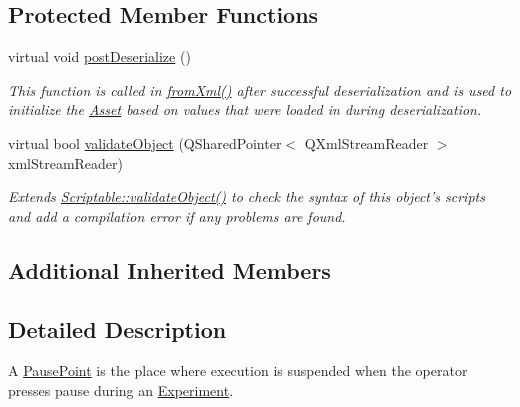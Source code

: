 \subsection*{Protected Member Functions}
\begin{DoxyCompactItemize}
\item 
virtual void \hyperlink{class_picto_1_1_pause_point_ad0934a59b009d24126005cab68edb641}{post\-Deserialize} ()
\begin{DoxyCompactList}\small\item\em This function is called in \hyperlink{class_picto_1_1_asset_a8bed4da09ecb1c07ce0dab313a9aba67}{from\-Xml()} after successful deserialization and is used to initialize the \hyperlink{class_picto_1_1_asset}{Asset} based on values that were loaded in during deserialization. \end{DoxyCompactList}\item 
\hypertarget{class_picto_1_1_pause_point_aea2bb7d2a12c263796508f90744a3220}{virtual bool \hyperlink{class_picto_1_1_pause_point_aea2bb7d2a12c263796508f90744a3220}{validate\-Object} (Q\-Shared\-Pointer$<$ Q\-Xml\-Stream\-Reader $>$ xml\-Stream\-Reader)}\label{class_picto_1_1_pause_point_aea2bb7d2a12c263796508f90744a3220}

\begin{DoxyCompactList}\small\item\em Extends \hyperlink{class_picto_1_1_scriptable_ab6e2944c43a3b5d418bf7b251594386d}{Scriptable\-::validate\-Object()} to check the syntax of this object's scripts and add a compilation error if any problems are found. \end{DoxyCompactList}\end{DoxyCompactItemize}
\subsection*{Additional Inherited Members}


\subsection{Detailed Description}
A \hyperlink{class_picto_1_1_pause_point}{Pause\-Point} is the place where execution is suspended when the operator presses pause during an \hyperlink{class_picto_1_1_experiment}{Experiment}. 

